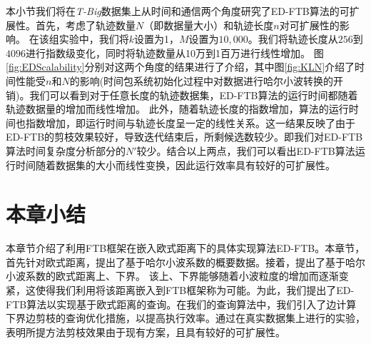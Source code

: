  本小节我们将在\emph{T-Big}数据集上从时间和通信两个角度研究了ED-FTB算法的可扩展性。首先，考虑了轨迹数量$N$（即数据量大小）和轨迹长度$n$对可扩展性的影响。
在该组实验中，我们将$k$设置为1，$M$设置为$10,000$。我们将轨迹长度从$256$到$4096$进行指数级变化，同时将轨迹数量从10万到1百万进行线性增加。
  图\ref{fig:EDScalability}分别对这两个角度的结果进行了介绍，其中图\ref{fig:KLN}介绍了时间性能受$n$和$N$的影响(时间包系统初始化过程中对数据进行哈尔小波转换的开销)。我们可以看到对于任意长度的轨迹数据集，ED-FTB算法的运行时间都随着轨迹数据量的增加而线性增加。
  此外，随着轨迹长度的指数增加，算法的运行时间也指数增加，即运行时间与轨迹长度呈一定的线性关系。这一结果反映了由于ED-FTB的剪枝效果较好，导致迭代结束后，所剩候选数较少。即我们对ED-FTB算法时间复杂度分析部分的$N'$较少。结合以上两点，我们可以看出ED-FTB算法运行时间随着数据集的大小而线性变换，因此运行效率具有较好的可扩展性。

\section{本章小结}\label{sec-c4-conclusion}
本章节介绍了利用FTB框架在嵌入欧式距离下的具体实现算法ED-FTB。本章节，首先针对欧式距离，提出了基于哈尔小波系数的概要数据。接着，提出了基于哈尔小波系数的欧式距离上、下界。
该上、下界能够随着小波粒度的增加而逐渐变紧，这使得我们利用将该距离嵌入到FTB框架称为可能。为此，我们提出了ED-FTB算法以实现基于欧式距离的查询。在我们的查询算法中，我们引入了边计算下界边剪枝的查询优化措施，以提高执行效率。通过在真实数据集上进行的实验，表明所提方法剪枝效果由于现有方案，且具有较好的可扩展性。

